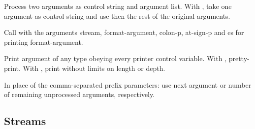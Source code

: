 \begin{LIST}{1cm}
\begin{LIST}{.5cm}
    {%
      Process two arguments as control string and argument list. With
      , take one argument as control string and use then the
      rest of the original arguments.
    }

    {%
      Call  with the arguments stream, format-ar\-gu\-ment,
      colon-p, at-sign-p and es for printing format-argument.
    }

    {%
      Print argument of any type obeying every printer control variable. With \kwd{:},
      pretty-print. With , print without limits on length or depth.
    }

    {\index{\#}
      In place of the comma-separated prefix parameters: use next
      argument or number of remaining unprocessed arguments, respectively.
    }

  \end{LIST}

\end{LIST}


\subsection{Streams} 


